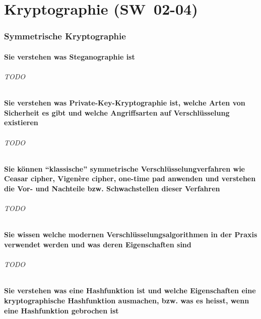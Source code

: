 \documentclass[10pt,a4paper]{article}
\begin{document}
\part{Kryptographie (SW~02-04)}
\section{Symmetrische Kryptographie}
\subsection*{Sie verstehen was Steganographie ist}
\paragraph*{TODO}
\subsection*{Sie verstehen was Private-Key-Kryptographie ist, welche Arten von Sicherheit es gibt und welche Angriffsarten auf Verschlüsselung existieren}
\paragraph*{TODO}
\subsection*{Sie können "`klassische"' symmetrische Verschlüsselungverfahren wie Ceasar cipher, Vigenère cipher, one-time pad anwenden und verstehen die Vor- und Nachteile bzw. Schwachstellen dieser Verfahren}
\paragraph*{TODO}
\subsection*{Sie wissen welche modernen Verschlüsselungsalgorithmen in der Praxis verwendet werden und was deren Eigenschaften sind}
\paragraph*{TODO}
\subsection*{Sie verstehen was eine Hashfunktion ist und welche Eigenschaften eine kryptographische Hashfunktion ausmachen, bzw. was es heisst, wenn eine Hashfunktion gebrochen ist}
\end{document}
